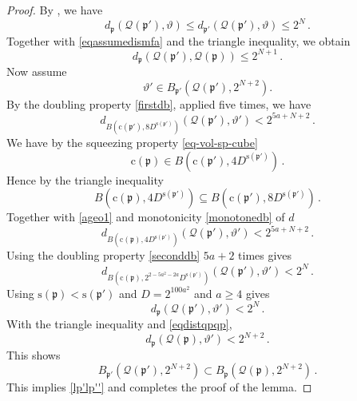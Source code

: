 \documentclass[10pt,a4paper]{article}
\theoremstyle{plain}
\theoremstyle{definition}
\numberwithin{equation}{subsection}
\newcommand{\fp}{{\mathfrak p}}
\newcommand{\pc}{{\mathrm{c}}}
\newcommand{\ps}{{\mathrm{s}}}
\newcommand{\mfa}{{\vartheta}}
\newcommand{\fcc}{{\mathcal{Q}}}
\newcommand{\leanok}{}
\begin{document}
\begin{proof}
\leanok
By , we have
\begin{equation}
     d_{\fp}(\fcc(\fp'),\mfa)
     \le d_{\fp'}(\fcc(\fp'),\mfa)
     \le 2^{N} \, .
\end{equation}
Together with \eqref{eqassumedismfa} and the triangle inequality, we obtain
\begin{equation}\label{eqdistqpqp}
    d_{\fp}(\fcc(\fp'),\fcc(\fp))\le 2^{N+1} \, .
\end{equation}
Now assume
\begin{equation}
    \mfa'\in B_{\fp'}(\fcc(\fp'),2^{N+2}).
\end{equation}
By the doubling property \eqref{firstdb}, applied five times, we have
\begin{equation}\label{ageo1} d_{B(\pc(\fp'),8D^{\ps(\fp')})}(\fcc(\fp'),\mfa') < 2^{5a+N+2}\, .
\end{equation}
We have by the squeezing property \eqref{eq-vol-sp-cube}
\begin{equation}
 \pc(\fp)\in
B(\pc(\fp'),4D^{\ps(\fp')})\, .
\end{equation}
Hence by the triangle inequality
\begin{equation}
 B(\pc(\fp), 4D^{\ps(\fp')})
 \subseteq
B(\pc(\fp'),8D^{\ps(\fp')})\, .
\end{equation}
Together with \eqref{ageo1} and monotonicity \eqref{monotonedb} of $d$
\begin{equation}
    d_{B(\pc(\fp),4D^{\ps(\fp')})}(\fcc(\fp'),\mfa') < 2^{5a+N+2}\, .
\end{equation}
Using the doubling property \eqref{seconddb} $5a+2$ times gives
\begin{equation}
    d_{B(\pc(\fp),2^{2-5a^2-2a}D^{\ps(\fp')})}(\fcc(\fp'),\mfa') < 2^{N}\, .
\end{equation}
Using $\ps(\fp)<\ps(\fp')$ and $D=2^{100a^2}$ and $a\ge 4$ gives
\begin{equation}
    d_{\fp}(\fcc(\fp'),\mfa') < 2^{N}\, .
\end{equation}
With the triangle inequality and \eqref{eqdistqpqp},
\begin{equation}
    d_{\fp}(\fcc(\fp),\mfa') < 2^{N+2}\, .
\end{equation}
This shows
\begin{equation}
B_{\fp'}(\fcc(\fp'),2^{N+2})\subset B_{\fp}(\fcc(\fp),2^{N+2})\, .
\end{equation}
This implies \eqref{lp'lp''} and completes the proof of the lemma.
\end{proof}
\end{document}
